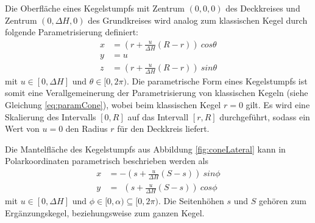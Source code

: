 Die Oberfläche eines Kegelstumpfs mit Zentrum $(0,0,0)$ des Deckkreises und Zentrum $(0,\Delta H, 0)$ des Grundkreises wird analog zum klassischen Kegel durch folgende Parametrisierung definiert:
\begin{equation} \label{eq:paramFrustum}
\begin{aligned}
x &= (r + \frac{u}{\Delta H} (R - r))~cos \theta \\
y &= u \\
z &= (r + \frac{u}{\Delta H} (R - r))~sin \theta
\end{aligned}
\end{equation}
mit $u\in [0, \Delta H]$ und $\theta \in [0, 2\pi)$. Die parametrische Form eines Kegelstumpfs ist somit eine Verallgemeinerung der Parametrisierung von klassischen Kegeln (siehe Gleichung \ref{eq:paramCone}), wobei beim klassischen Kegel $r = 0$ gilt. Es wird eine Skalierung des Intervalls $[0, R]$ auf das Intervall $[r, R]$ durchgeführt, sodass ein Wert von $u = 0$ den Radius $r$ für den Deckkreis liefert. 

Die Mantelfläche des Kegelstumpfs aus Abbildung \ref{fig:coneLateral} kann in Polarkoordinaten parametrisch beschrieben werden als
\begin{equation} \label{eq:paramLateral}
\begin{aligned}
x &= -(s + \frac{u}{\Delta H}(S-s)) ~sin \phi \\
y &= ~~(s + \frac{u}{\Delta H} (S-s)) ~cos \phi
\end{aligned}
\end{equation}
mit  $u\in [0, \Delta H]$ und $\phi \in [0, \alpha) \subseteq [0, 2\pi)$. Die Seitenhöhen $s$ und $S$ gehören zum Ergänzungskegel, beziehungsweise zum ganzen Kegel.

